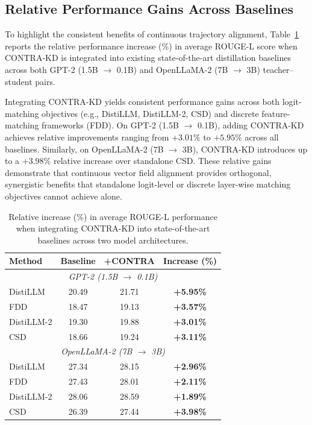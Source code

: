 \documentclass{article} %
\theoremstyle{definition}
\theoremstyle{remark}
\begin{document}
\subsection{Relative Performance Gains Across Baselines}
\label{sec:appendix_relative_gains}

To highlight the consistent benefits of continuous trajectory alignment, Table~\ref{tab:relative_increase} reports the relative performance increase (\%) in average ROUGE-L score when CONTRA-KD is integrated into existing state-of-the-art distillation baselines across both GPT-2 (1.5B $\rightarrow$ 0.1B) and OpenLLaMA-2 (7B $\rightarrow$ 3B) teacher--student pairs.

Integrating CONTRA-KD yields consistent performance gains across both logit-matching objectives (e.g., DistiLLM, DistiLLM-2, CSD) and discrete feature-matching frameworks (FDD). On GPT-2 (1.5B $\rightarrow$ 0.1B), adding CONTRA-KD achieves relative improvements ranging from $+3.01\%$ to $+5.95\%$ across all baselines. Similarly, on OpenLLaMA-2 (7B $\rightarrow$ 3B), CONTRA-KD introduces up to a $+3.98\%$ relative increase over standalone CSD. These relative gains demonstrate that continuous vector field alignment provides orthogonal, synergistic benefits that standalone logit-level or discrete layer-wise matching objectives cannot achieve alone.

\begin{table}[htbp]
\centering
\small
\setlength{\tabcolsep}{14pt}
\caption{Relative increase (\%) in average ROUGE-L performance when integrating CONTRA-KD into state-of-the-art baselines across two model architectures.}
\label{tab:relative_increase}
\begin{tabular}{lccc}
\toprule
\textbf{Method} & \textbf{Baseline} & \textbf{+CONTRA} & \textbf{Increase (\%)} \\
\midrule
\multicolumn{4}{c}{\textit{GPT-2 (1.5B $\rightarrow$ 0.1B)}} \\
\midrule
DistiLLM   & 20.49 & 21.71 & \textbf{+5.95\%} \\
FDD        & 18.47 & 19.13 & \textbf{+3.57\%} \\
DistiLLM-2 & 19.30 & 19.88 & \textbf{+3.01\%} \\
CSD        & 18.66 & 19.24 & \textbf{+3.11\%} \\
\midrule
\multicolumn{4}{c}{\textit{OpenLLaMA-2 (7B $\rightarrow$ 3B)}} \\
\midrule
DistiLLM   & 27.34 & 28.15 & \textbf{+2.96\%} \\
FDD        & 27.43 & 28.01 & \textbf{+2.11\%} \\
DistiLLM-2 & 28.06 & 28.59 & \textbf{+1.89\%} \\
CSD        & 26.39 & 27.44 & \textbf{+3.98\%} \\
\bottomrule
\end{tabular}
\end{table}
\end{document}
